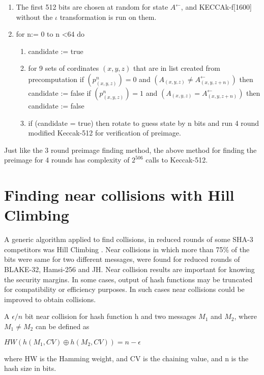 \begin{enumerate}
\item The first 512 bits are chosen at random for state $A^{\leftarrow}$, and KECCAk-f[1600] without the $\iota$
transformation is run on them.
\item for n:= 0 to n \textless 64 do
  \begin{enumerate}
  \item candidate := true
  \item for 9 sets of cordinates $(x, y, z)$ that are in list created from precomputation
  \newline if $(p^n_{(x, y, z)}) = 0$ and $(A_{(x, y, z)} \neq A^{\leftarrow}_{(x, y, z+n)})$ then candidate := false
  \newline if $(p^n_{(x, y, z)}) = 1$ and $(A_{(x, y, z)} = A^{\leftarrow}_{(x, y, z+n)})$ then candidate := false
  \item if (candidate = true) then rotate to guess state by n bits and run 4 round modified Keccak-512 for verification
  of preimage.
  \end{enumerate}
\end{enumerate}

Just like the 3 round preimage finding method, the above method for finding the preimage for 4 rounds has complexity of
$2^{506}$ calls to Keccak-512.

\section{Finding near collisions with Hill Climbing}

A generic algorithm applied to find collisions, in reduced rounds of some SHA-3 competitors was Hill Climbing
\cite{00029}. Near collisions in which more than 75\% of the bits were same for two different messages, were found 
for reduced rounds of BLAKE-32, Hamsi-256 and JH. Near collision results are important for knowing the security
margins. In some cases, output of hash functions may be truncated for compatibility or efficiency purposes. In 
such cases near collisions could be improved to obtain collisions.

A $\epsilon / n $ bit near collision for hash function h and two messages $M_{1}$ and $M_{2}$, where $M_{1} \neq M_{2}$ can be 
defined as
\begin{center}$HW( h( M_{1}, CV ) \oplus h( M_{2}, CV ) ) = n - \epsilon $\end{center}
where HW is the Hamming weight, and CV is the chaining value, and n is the hash size in bits.

